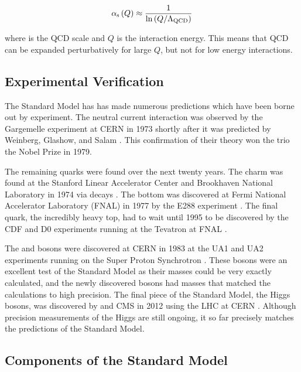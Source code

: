 \begin{equation}\label{eq:alpha_strong}
    \alpha_{\text{s}} \left( Q \right)
    \approx
    \frac{1}{
        \operatorname{ln} \left( Q / \Lambda_{\text{QCD}} \right)
    }
\end{equation}

where \LambdaQCD is the QCD scale and $Q$ is the interaction energy. This means
that QCD can be expanded perturbatively for large $Q$, but not for low energy
interactions.

\subsection{Experimental Verification}

The Standard Model has has made numerous predictions which have been borne out
by experiment. The neutral current interaction was observed by the Gargemelle
experiment at CERN in 1973 shortly after it was predicted by Weinberg, Glashow,
and Salam \cite{hasert1973}. This confirmation of their theory won the trio the
Nobel Prize in 1979.

The remaining quarks were found over the next twenty years. The charm was found
at the Stanford Linear Accelerator Center and Brookhaven National Laboratory in
1974 via \jpsi decays \cite{aubert1974,augustin1974}. The bottom was discovered
at Fermi National Accelerator Laboratory (FNAL) in 1977 by the E288 experiment
\cite{herb1977}. The final quark, the incredibly heavy top, had to wait until
1995 to be discovered by the CDF and D0 experiments running at the Tevatron at
FNAL \cite{cdf1995,d01995}.

The \W and \Z bosons were discovered at CERN in 1983 at the UA1 and UA2
experiments running on the Super Proton Synchrotron
\cite{ua1_w,ua2_w,ua1_z,ua2_z}. These bosons were an excellent test of the
Standard Model as their masses could be very exactly calculated, and the newly
discovered bosons had masses that matched the calculations to high precision.
The final piece of the Standard Model, the Higgs bosons, was discovered by
\ATLAS and CMS in 2012 using the LHC at CERN \cite{atlas_higgs,cms_higgs}.
Although precision measurements of the Higgs are still ongoing, it so far
precisely matches the predictions of the Standard Model.

\subsection{Components of the Standard Model}

